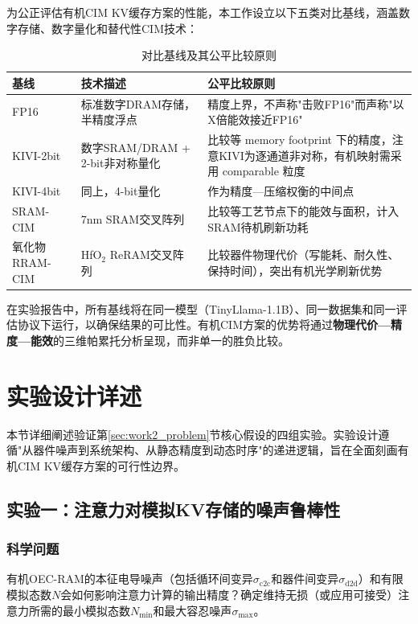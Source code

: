 为公正评估有机CIM KV缓存方案的性能，本工作设立以下五类对比基线，涵盖数字存储、数字量化和替代性CIM技术：

\begin{table}[htbp]
\centering
\caption{对比基线及其公平比较原则}
\label{tab:baselines}
\begin{tabular}{lp{4cm}p{5cm}}
\toprule
基线 & 技术描述 & 公平比较原则 \\
\midrule
FP16 & 标准数字DRAM存储，半精度浮点 & 精度上界，不声称"击败FP16"而声称"以X倍能效接近FP16" \\
KIVI-2bit & 数字SRAM/DRAM + 2-bit非对称量化~\cite{liu2024kivi} & 比较等 memory footprint 下的精度，注意KIVI为逐通道非对称，有机映射需采用 comparable 粒度 \\
KIVI-4bit & 同上，4-bit量化 & 作为精度—压缩权衡的中间点 \\
SRAM-CIM & 7nm SRAM交叉阵列~\cite{hastily2023} & 比较等工艺节点下的能效与面积，计入SRAM待机刷新功耗 \\
氧化物RRAM-CIM & HfO$_2$ ReRAM交叉阵列~\cite{huang2024retransformer} & 比较器件物理代价（写能耗、耐久性、保持时间），突出有机光学刷新优势 \\
\bottomrule
\end{tabular}
\end{table}

在实验报告中，所有基线将在同一模型（TinyLlama-1.1B）、同一数据集和同一评估协议下运行，以确保结果的可比性。有机CIM方案的优势将通过\textbf{物理代价—精度—能效}的三维帕累托分析呈现，而非单一的胜负比较。


\section{实验设计详述}
\label{sec:work2_experiments}

本节详细阐述验证第\ref{sec:work2_problem}节核心假设的四组实验。实验设计遵循"从器件噪声到系统架构、从静态精度到动态时序"的递进逻辑，旨在全面刻画有机CIM KV缓存方案的可行性边界。

\subsection{实验一：注意力对模拟KV存储的噪声鲁棒性}
\label{sec:exp1_noise}

\subsubsection{科学问题}

有机OEC-RAM的本征电导噪声（包括循环间变异$\sigma_{\text{c2c}}$和器件间变异$\sigma_{\text{d2d}}$）和有限模拟态数$N$会如何影响注意力计算的输出精度？确定维持无损（或应用可接受）注意力所需的最小模拟态数$N_{\text{min}}$和最大容忍噪声$\sigma_{\text{max}}$。

